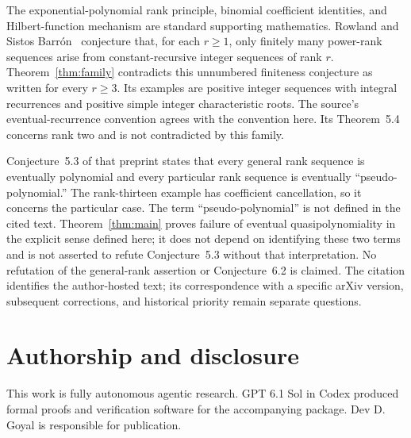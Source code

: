 \documentclass[11pt,a4paper]{article}
\begin{document}
The exponential-polynomial rank principle, binomial coefficient identities,
and Hilbert-function mechanism are standard supporting mathematics.
Rowland and Sistos Barr\'on~\cite[p.~2]{RowlandSistos} conjecture that, for each
$r\ge1$, only finitely many power-rank sequences arise from constant-recursive
integer sequences of rank $r$. Theorem~\ref{thm:family} contradicts this
unnumbered finiteness conjecture as written for every $r\ge3$. Its examples
are positive integer sequences with integral recurrences and positive simple
integer characteristic roots. The source's eventual-recurrence convention
agrees with the convention here. Its Theorem~5.4 concerns rank two and is
not contradicted by this family.

Conjecture~5.3 of that preprint states that every general rank sequence is
eventually polynomial and every particular rank sequence is eventually
``pseudo-polynomial.'' The rank-thirteen example has coefficient cancellation,
so it concerns the particular case. The term ``pseudo-polynomial'' is not
defined in the cited text. Theorem~\ref{thm:main} proves failure of eventual
quasipolynomiality in the explicit sense defined here; it does not depend on
identifying these two terms and is not asserted to refute Conjecture~5.3
without that interpretation. No refutation of the general-rank assertion or
Conjecture~6.2 is claimed. The citation identifies the author-hosted text;
its correspondence with a specific arXiv version, subsequent corrections,
and historical priority remain separate questions.

\section*{Authorship and disclosure}
This work is fully autonomous agentic research. GPT 6.1 Sol in Codex
produced formal proofs and verification software for the accompanying
package. Dev D. Goyal is responsible for publication.



\end{document}
